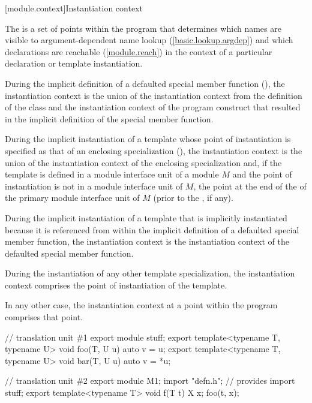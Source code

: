 [module.context]{Instantiation context}

\begin{std.txt}\color{addclr}
\pnum
The  is a set of points within the program
that determines which names are visible to argument-dependent name lookup
(\ref{basic.lookup.argdep})
and which declarations are reachable (\ref{module.reach})
in the context of a particular declaration or template instantiation.

\pnum
During the implicit definition of a defaulted special member function
(),
the instantiation context is the union of
the instantiation context from the definition of the class and
the instantiation context of the program construct that
resulted in the implicit definition of the special member function.

\pnum
During the implicit instantiation of a template
whose point of instantiation is specified as
that of an enclosing specialization (),
the instantiation context is the union of
the instantiation context of the enclosing specialization and,
if the template is defined in a module interface unit of a module $M$
and the point of instantiation is not in a module interface unit of $M$,
the point at the end of the
 of the
primary module interface unit of $M$
(prior to the , if any).

\pnum
During the implicit instantiation of a template
that is implicitly instantiated because it is referenced
from within the implicit definition of a defaulted special member function,
the instantiation context is the instantiation context of
the defaulted special member function.

\pnum
During the instantiation of any other template specialization,
the instantiation context comprises the point of instantiation
of the template.

\pnum
In any other case, the instantiation context
at a point within the program
comprises that point.

\pnum
\begin{example}
\begin{codeblock}
// translation unit \#1
export module stuff;
export template<typename T, typename U> void foo(T, U u) { auto v = u; }
export template<typename T, typename U> void bar(T, U u) { auto v = *u; }

// translation unit \#2
export module M1;
import "defn.h";        // provides 
import stuff;
export template<typename T> void f(T t) {
 X x;
 foo(t, x);
}


\end{codeblock}
\end{example}
\end{std.txt}
